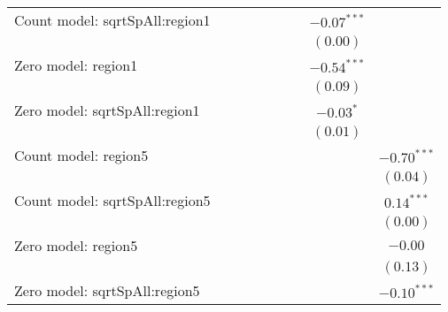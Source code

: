 \begin{sidewaystable}
\begin{center}
{\begin{tabular}{l c c c c c c c c}
Count model: sqrtSpAll:region1 &                &               &               &               &               &               & $-0.07^{***}$ &               \\
                               &                &               &               &               &               &               & $(0.00)$      &               \\
Zero model: region1            &                &               &               &               &               &               & $-0.54^{***}$ &               \\
                               &                &               &               &               &               &               & $(0.09)$      &               \\
Zero model: sqrtSpAll:region1  &                &               &               &               &               &               & $-0.03^{*}$   &               \\
                               &                &               &               &               &               &               & $(0.01)$      &               \\
Count model: region5           &                &               &               &               &               &               &               & $-0.70^{***}$ \\
                               &                &               &               &               &               &               &               & $(0.04)$      \\
Count model: sqrtSpAll:region5 &                &               &               &               &               &               &               & $0.14^{***}$  \\
                               &                &               &               &               &               &               &               & $(0.00)$      \\
Zero model: region5            &                &               &               &               &               &               &               & $-0.00$       \\
                               &                &               &               &               &               &               &               & $(0.13)$      \\
Zero model: sqrtSpAll:region5  &                &               &               &               &               &               &               & $-0.10^{***}$ \\

\end{tabular}}
\end{center}
\end{sidewaystable}
